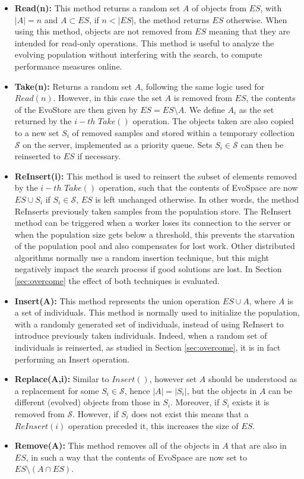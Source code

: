 \begin{itemize}
 \item \textbf{Read(n):} This method returns a random set $A$ of objects from $ES$, with $|A|=n$ and $A\subset ES$, if $n< |ES|$, the method returns $ES$ otherwise. When using this method, objects are not removed from $ES$ meaning that they are intended for read-only operations.
This method is useful to analyze the evolving population without interfering with the search, to compute performance measures online.

\item \textbf{Take(n):} Returns a random set $A$, following the same logic used for $Read(n)$. However, in this case the set $A$ is removed from $ES$, the contents of the EvoStore are then given by $ES = ES \setminus A$.
We define  $A_i$ as the set returned by the $i-th$ $Take()$ operation.
The objects taken are also copied to a new set $S_i$ of removed samples and stored
within a temporary collection $\mathcal{S}$ on the server, implemented as a priority queue. Sets $S_i \in \mathcal{S}$ can then be reinserted to $ES$ if necessary.  
 
 \item \textbf{ReInsert(i):} This method is used to reinsert the subset of elements removed by the $i-th$ $Take()$ operation,
  such that the contents of EvoSpace are now $ES \cup S_i$ if $S_i \in \mathcal{S}$, $ES$ is left unchanged otherwise.
  In other words, the method ReInserts previously taken samples from the population store.
  The ReInsert method can be triggered when a worker loses its connection to the server or when the population size gets below a threshold, this prevents the starvation
  of the population pool and also compensates for lost work. Other distributed algorithms normally use a random insertion technique, but this might negatively impact the search process if good solutions are lost. In Section \ref{sec:overcome} the effect of both techniques is evaluated.
      
 \item \textbf{Insert(A):} This method represents the union operation $ES \cup A$, where $A$ is a set of individuals.
 This method is normally used to initialize the population, with a randomly generated set of individuals, instead of using ReInsert to introduce previously taken individuals. Indeed, when a random set of individuals is reinserted, as studied in Section \ref{sec:overcome}, it is in fact performing an Insert operation.

 \item \textbf{Replace(A,i):} Similar to $Insert()$, however set $A$ should be understood as a replacement for
  some $S_i \in \mathcal{S}$, hence $|A| = |S_i|$, but the objects in $A$ can be different (evolved) objects from those in $S_i$.
  Moreover, if $S_i$ exists it is removed from $\mathcal{S}$.
  However, if $S_i$ does not exist this means that a $ReInsert(i)$ operation preceded it, this increases the size of $ES$.

 \item \textbf{Remove(A):} This method removes all of the objects in $A$ that are also in $ES$, in such a way that
  the contents of EvoSpace are now set to $ES \setminus (A\cap ES)$.
\end{itemize}


